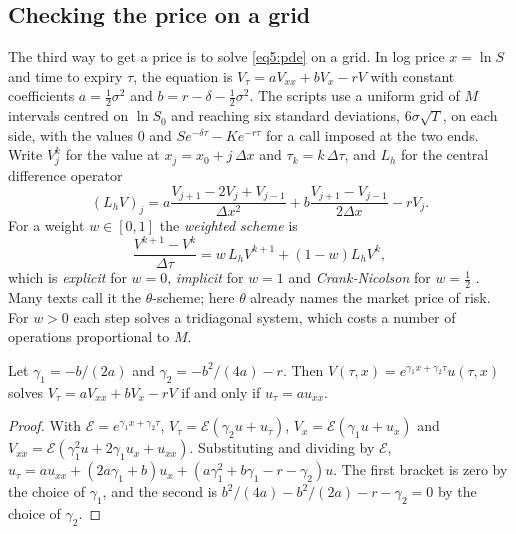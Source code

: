 \begin{chapterrefs}
\section{Checking the price on a grid}
\label{sec5:fd}

The third way to get a price is to solve \cref{eq5:pde} on a grid. In log price $x=\ln S$ and time to
expiry $\tau$, the equation is $V_\tau=aV_{xx}+bV_x-rV$ with constant coefficients $a=\tfrac12\sigma^2$
and $b=r-\delta-\tfrac12\sigma^2$. The scripts use a uniform grid of $M$ intervals centred on $\ln S_0$ and
reaching six standard deviations, $6\sigma\sqrt T$, on each side, with the values $0$ and
$Se^{-\delta\tau}-Ke^{-r\tau}$ for a call imposed at the two ends. Write $V^k_j$ for the value at
$x_j=x_0+j\,\Delta x$ and $\tau_k=k\,\Delta\tau$, and $L_h$ for the central difference operator
\begin{equation*}
  (L_hV)_j=a\frac{V_{j+1}-2V_j+V_{j-1}}{\Delta x^2}+b\frac{V_{j+1}-V_{j-1}}{2\Delta x}-rV_j .
\end{equation*}
For a weight $w\in[0,1]$ the \emph{weighted scheme} is
\begin{equation}\label{eq5:theta}
  \frac{V^{k+1}-V^k}{\Delta\tau}=w\,L_hV^{k+1}+(1-w)L_hV^k,
\end{equation}
which is \emph{explicit} for $w=0$, \emph{implicit} for $w=1$ and \emph{Crank-Nicolson} for
$w=\tfrac12$ \parencite{crank1947}. Many texts call it the $\theta$-scheme; here $\theta$ already names the market price of risk.
For $w>0$ each step solves a tridiagonal system, which costs a number of operations proportional to
$M$.

\begin{lemma}\label{lem5:heat}
Let $\gamma_1=-b/(2a)$ and $\gamma_2=-b^2/(4a)-r$. Then $V(\tau,x)=e^{\gamma_1x+\gamma_2\tau}u(\tau,x)$ solves
$V_\tau=aV_{xx}+bV_x-rV$ if and only if $u_\tau=au_{xx}$.
\end{lemma}

\begin{proof}
With $\mathcal E=e^{\gamma_1x+\gamma_2\tau}$, $V_\tau=\mathcal E(\gamma_2u+u_\tau)$, $V_x=\mathcal E(\gamma_1u+u_x)$ and
$V_{xx}=\mathcal E(\gamma_1^2u+2\gamma_1u_x+u_{xx})$. Substituting and dividing by $\mathcal E$,
$u_\tau=au_{xx}+(2a\gamma_1+b)u_x+(a\gamma_1^2+b\gamma_1-r-\gamma_2)u$. The first bracket is zero by the choice of
$\gamma_1$, and the second is $b^2/(4a)-b^2/(2a)-r-\gamma_2=0$ by the choice of $\gamma_2$.
\end{proof}


\end{chapterrefs}
